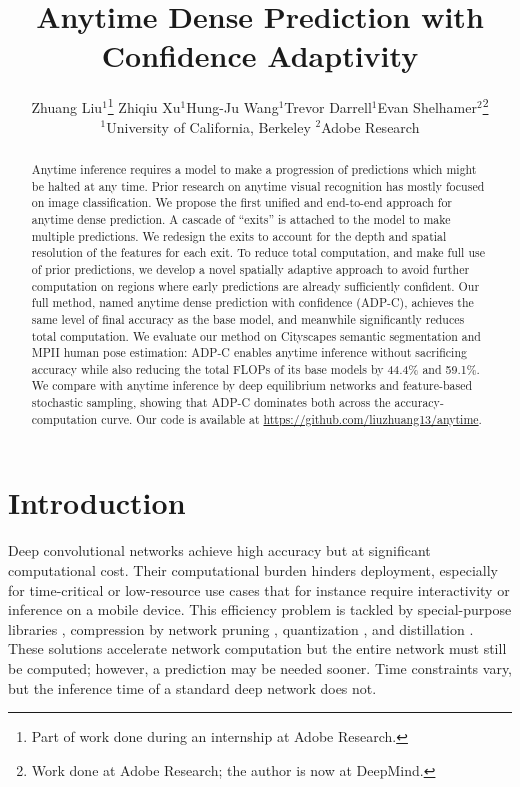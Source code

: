 \documentclass{article} %
\title{Anytime Dense Prediction with \\ Confidence Adaptivity}
\author{Zhuang Liu$^1$\thanks{Part of work done during an internship at Adobe Research.} \quad      Zhiqiu Xu$^1$\quad Hung-Ju Wang$^1$\quad Trevor Darrell$^1$\quad Evan Shelhamer$^2$\thanks{Work done at Adobe Research; the author is now at DeepMind.} \vspace{0.3ex}  \\
$^1$University of California, Berkeley \quad $^2$Adobe Research\\
}
\begin{document}
\maketitle
\graphicspath{ {./images/} }

\begin{abstract}
Anytime inference requires a model to make a progression of predictions which might be halted at any time. Prior research on anytime visual recognition has mostly focused on image classification. We propose the first unified and end-to-end approach for anytime dense prediction. A cascade of ``exits'' is attached to the model to make multiple predictions. We redesign the exits to account for the depth and spatial resolution of the features for each exit. To reduce total computation, and make full use of prior predictions, we develop a novel spatially adaptive approach to avoid further computation on regions where early predictions are already sufficiently confident. Our full method, named anytime dense prediction with confidence (ADP-C), achieves the same level of final accuracy as the base model, and meanwhile significantly reduces total computation. We evaluate our method on Cityscapes semantic segmentation and MPII human pose estimation: ADP-C enables anytime inference without sacrificing accuracy while also reducing the total FLOPs of its base models by 44.4\% and 59.1\%. We compare with anytime inference by deep equilibrium networks and feature-based stochastic sampling, showing that ADP-C dominates both across the accuracy-computation curve. Our code is available at \url{https://github.com/liuzhuang13/anytime}.
\end{abstract}

\section{Introduction}
Deep convolutional networks \citep{krizhevsky2017imagenet,he2016deep} achieve high accuracy but at significant computational cost.
Their computational burden hinders deployment, especially for time-critical or low-resource use cases that for instance require interactivity or inference on a mobile device.
This efficiency problem is tackled by special-purpose libraries \citep{chetlur2014cudnn}, compression by network pruning
\citep{han2015learning,li2016pruning,liu2019rethinking}, quantization \citep{rastegari2016xnor,jacob2018quantization}, and distillation \citep{hinton2015distilling,romero2014fitnets}.
These solutions accelerate network computation but the entire network must still be computed; however, a prediction may be needed sooner.
Time constraints vary, but the inference time of a standard deep network does not.
\end{document}
